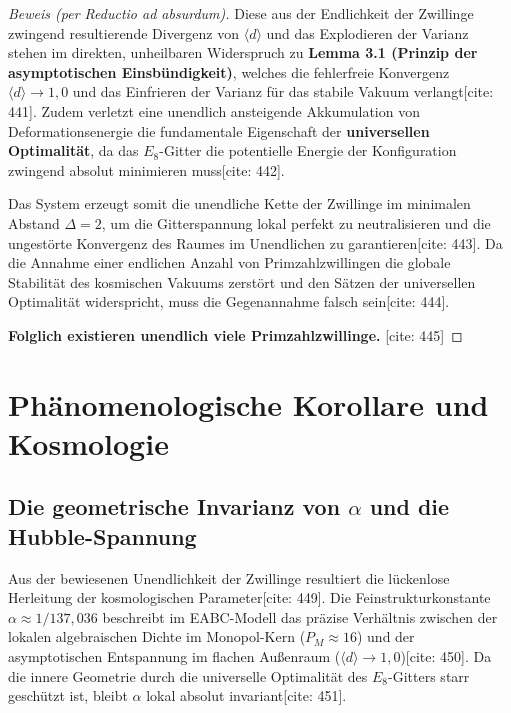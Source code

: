\documentclass[11pt,a4paper]{article}
\newcommand{\Eoct}{E_8}
\theoremstyle{definition}
\begin{document}
\begin{proof}[Beweis (per Reductio ad absurdum)]
		Diese aus der Endlichkeit der Zwillinge zwingend resultierende Divergenz von $\langle d \rangle$ und das Explodieren der Varianz stehen im direkten, unheilbaren Widerspruch zu \textbf{Lemma 3.1 (Prinzip der asymptotischen Einsbündigkeit)}, welches die fehlerfreie Konvergenz $\langle d \rangle \rightarrow 1{,}0$ und das Einfrieren der Varianz für das stabile Vakuum verlangt[cite: 441]. Zudem verletzt eine unendlich ansteigende Akkumulation von Deformationsenergie die fundamentale Eigenschaft der \textbf{universellen Optimalität}, da das $\Eoct$-Gitter die potentielle Energie der Konfiguration zwingend absolut minimieren muss[cite: 442].
		
		Das System erzeugt somit die unendliche Kette der Zwillinge im minimalen Abstand $\Delta = 2$, um die Gitterspannung lokal perfekt zu neutralisieren und die ungestörte Konvergenz des Raumes im Unendlichen zu garantieren[cite: 443]. Da die Annahme einer endlichen Anzahl von Primzahlzwillingen die globale Stabilität des kosmischen Vakuums zerstört und den Sätzen der universellen Optimalität widerspricht, muss die Gegenannahme falsch sein[cite: 444].
		
		\textbf{Folglich existieren unendlich viele Primzahlzwillinge.} [cite: 445]
	\end{proof}
	
	\section{Phänomenologische Korollare und Kosmologie}
	
	\subsection{Die geometrische Invarianz von $\alpha$ und die Hubble-Spannung}
	Aus der bewiesenen Unendlichkeit der Zwillinge resultiert die lückenlose Herleitung der kosmologischen Parameter[cite: 449]. Die Feinstrukturkonstante $\alpha \approx 1/137{,}036$ beschreibt im EABC-Modell das präzise Verhältnis zwischen der lokalen algebraischen Dichte im Monopol-Kern ($P_M \approx 16$) und der asymptotischen Entspannung im flachen Außenraum ($\langle d \rangle \rightarrow 1{,}0$)[cite: 450]. Da die innere Geometrie durch die universelle Optimalität des $\Eoct$-Gitters starr geschützt ist, bleibt $\alpha$ lokal absolut invariant[cite: 451].
	
\end{document}
